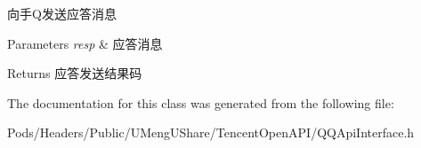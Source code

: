 向手\+Q发送应答消息 
\begin{DoxyParams}{Parameters}
{\em resp} & 应答消息 \\
\hline
\end{DoxyParams}
\begin{DoxyReturn}{Returns}
应答发送结果码 
\end{DoxyReturn}


The documentation for this class was generated from the following file\+:\begin{DoxyCompactItemize}
\item 
Pods/\+Headers/\+Public/\+U\+Meng\+U\+Share/\+Tencent\+Open\+A\+P\+I/Q\+Q\+Api\+Interface.\+h\end{DoxyCompactItemize}
